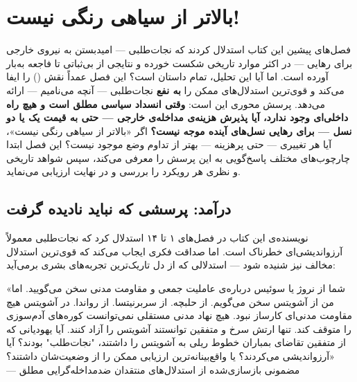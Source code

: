 \chapter{بالاتر از سیاهی رنگی نیست!}
\label{ch:sacrificial-liberation}

\begin{tcolorbox}[mybox, title={چکیده‌ی فصل}]
فصل‌های پیشین این کتاب استدلال کردند که نجات‌طلبی — امیدبستن به نیروی خارجی برای رهایی — در اکثر موارد تاریخی شکست خورده و نتایجی از بی‌ثباتی تا فاجعه به‌بار آورده است. اما آیا این تحلیل، تمام داستان است؟ این فصل عمداً نقش  () را ایفا می‌کند و قوی‌ترین استدلال‌های ممکن را \textbf{به نفع} نجات‌طلبی — آنچه  می‌نامیم — ارائه می‌دهد. پرسش محوری این است: \textbf{وقتی انسداد سیاسی مطلق است و هیچ راه داخلی‌ای وجود ندارد، آیا پذیرش هزینه‌ی مداخله‌ی خارجی — حتی به قیمت یک یا دو نسل — برای رهایی نسل‌های آینده موجه نیست؟} اگر «بالاتر از سیاهی رنگی نیست»، آیا هر تغییری — حتی پرهزینه — بهتر از تداوم وضع موجود نیست؟ این فصل ابتدا چارچوب‌های مختلف پاسخ‌گویی به این پرسش را معرفی می‌کند، سپس شواهد تاریخی و نظری هر رویکرد را بررسی و در نهایت ارزیابی می‌نماید.
\end{tcolorbox}

\section{درآمد: پرسشی که نباید نادیده گرفت}
\label{sec:ch15-intro}

نویسنده‌ی این کتاب در فصل‌های ۱ تا ۱۴ استدلال کرد که نجات‌طلبی معمولاً آرزواندیشی‌ای خطرناک است. اما صداقت فکری ایجاب می‌کند که قوی‌ترین استدلال مخالف نیز شنیده شود — استدلالی که از دل تاریک‌ترین تجربه‌های بشری برمی‌آید:

\begin{tcolorbox}[quotebox, title={صدای دیگر}]
«شما از نروژ یا سوئیس درباره‌ی عاملیت جمعی و مقاومت مدنی سخن می‌گویید. اما من از آشویتس سخن می‌گویم. از حلبچه. از سربرنیتسا. از رواندا. در آشویتس هیچ مقاومت مدنی‌ای کارساز نبود. هیچ نهاد مدنی مستقلی نمی‌توانست کوره‌های آدم‌سوزی را متوقف کند. تنها ارتش سرخ و متفقین توانستند آشویتس را آزاد کنند. آیا یهودیانی که از متفقین تقاضای بمباران خطوط ریلی به آشویتس را داشتند، "نجات‌طلب" بودند؟ آیا آرزواندیشی می‌کردند؟ یا واقع‌بینانه‌ترین ارزیابی ممکن را از وضعیت‌شان داشتند؟»\\
— مضمونی بازسازی‌شده از استدلال‌های منتقدان ضدمداخله‌گرایی مطلق
\end{tcolorbox}

